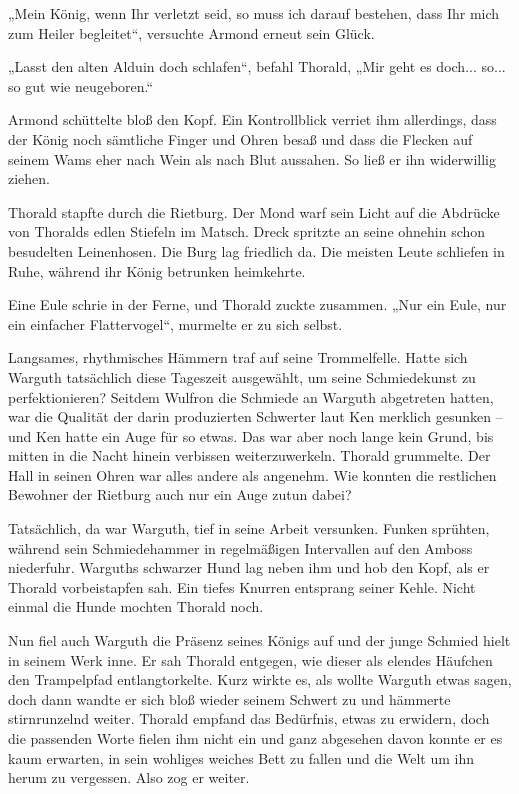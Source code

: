 „Mein König, wenn Ihr verletzt seid, so muss ich darauf bestehen, dass Ihr mich zum Heiler begleitet“, versuchte Armond erneut sein Glück.

„Lasst den alten Alduin doch schlafen“, befahl Thorald, „Mir geht es doch... so... so gut wie neugeboren.“

Armond schüttelte bloß den Kopf. Ein Kontrollblick verriet ihm allerdings, dass der König noch sämtliche Finger und Ohren besaß und dass die Flecken auf seinem Wams eher nach Wein als nach Blut aussahen. So ließ er ihn widerwillig ziehen.



\trennzeichen



Thorald stapfte durch die Rietburg. Der Mond warf sein Licht auf die Abdrücke von Thoralds edlen Stiefeln im Matsch. Dreck spritzte an seine ohnehin schon besudelten Leinenhosen. Die Burg lag friedlich da. Die meisten Leute schliefen in Ruhe, während ihr König betrunken heimkehrte.

Eine Eule schrie in der Ferne, und Thorald zuckte zusammen. „Nur ein Eule, nur ein einfacher Flattervogel“, murmelte er zu sich selbst.

Langsames, rhythmisches Hämmern traf auf seine Trommelfelle. Hatte sich Warguth tatsächlich diese Tageszeit ausgewählt, um seine Schmiedekunst zu perfektionieren? Seitdem Wulfron die Schmiede an Warguth abgetreten hatten, war die Qualität der darin produzierten Schwerter laut Ken merklich gesunken – und Ken hatte ein Auge für so etwas. Das war aber noch lange kein Grund, bis mitten in die Nacht hinein verbissen weiterzuwerkeln. Thorald grummelte. Der Hall in seinen Ohren war alles andere als angenehm. Wie konnten die restlichen Bewohner der Rietburg auch nur ein Auge zutun dabei?

Tatsächlich, da war Warguth, tief in seine Arbeit versunken. Funken sprühten, während sein Schmiedehammer in regelmäßigen Intervallen auf den Amboss niederfuhr. Warguths schwarzer Hund lag neben ihm und hob den Kopf, als er Thorald vorbeistapfen sah. Ein tiefes Knurren entsprang seiner Kehle. Nicht einmal die Hunde mochten Thorald noch.

Nun fiel auch Warguth die Präsenz seines Königs auf und der junge Schmied hielt in seinem Werk inne. Er sah Thorald entgegen, wie dieser als elendes Häufchen den Trampelpfad entlangtorkelte. Kurz wirkte es, als wollte Warguth etwas sagen, doch dann wandte er sich bloß wieder seinem Schwert zu und hämmerte stirnrunzelnd weiter. Thorald empfand das Bedürfnis, etwas zu erwidern, doch die passenden Worte fielen ihm nicht ein und ganz abgesehen davon konnte er es kaum erwarten, in sein wohliges weiches Bett zu fallen und die Welt um ihn herum zu vergessen. Also zog er weiter.



